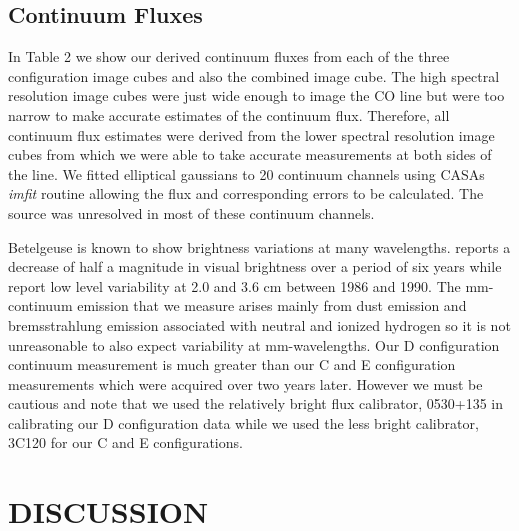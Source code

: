 \documentclass[preprint2]{aastex}
\begin{document}
\subsection{Continuum Fluxes} \label{results4} 

In Table 2 we show our derived continuum fluxes from each of the three configuration image cubes and also the combined image cube. The high spectral resolution image cubes were just wide enough to image the CO line but were too narrow to make accurate estimates of the continuum flux. Therefore, all continuum flux estimates were derived from the lower spectral resolution image cubes from which we were able to take accurate measurements at both sides of the line. We fitted elliptical gaussians to 20 continuum channels using CASAs \textit{imfit} routine allowing the flux and corresponding errors to be calculated. The source was unresolved in most of these continuum channels. 

Betelgeuse is known to show brightness variations at many wavelengths. \cite{1984PASP...96..366G} reports a decrease of half a magnitude in visual brightness over a period of six years while \cite{1986AJ.....91..602D} report low level variability at 2.0 and 3.6 cm between 1986 and 1990. The mm-continuum emission that we measure arises mainly from dust emission and bremsstrahlung emission associated with neutral and ionized hydrogen so it is not unreasonable to also expect variability at mm-wavelengths. Our D configuration continuum measurement is much greater than our C and E configuration measurements which were acquired over two years later. However we must be cautious and note that we used the relatively bright flux calibrator, 0530+135 in calibrating our D configuration data while we used the less bright calibrator, 3C120 for our C and E configurations.

\section{DISCUSSION}
\end{document}
